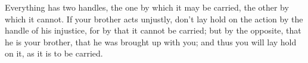 Everything has two handles, the one by which it may be carried,
the other by which it cannot. If your brother acts unjustly, don't
lay hold on the action by the handle of his injustice, for by that
it cannot be carried; but by the opposite, that he is your brother,
that he was brought up with you; and thus you will lay hold on it,
as it is to be carried. 
